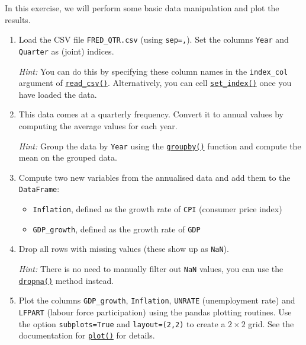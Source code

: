 \documentclass{scrartcl}
\providecommand{\tightlist}{%
      \setlength{\itemsep}{0pt}\setlength{\parskip}{0pt}}
\begin{document}
In this exercise, we will perform some basic data manipulation and plot
the results.

\begin{enumerate}
\def\labelenumi{\arabic{enumi}.}
\item
  Load the CSV file \texttt{FRED\_QTR.csv} (using
  \texttt{sep=\textquotesingle{},\textquotesingle{}}). Set the columns
  \texttt{Year} and \texttt{Quarter} as (joint) indices.

  \emph{Hint:} You can do this by specifying these column names in the
  \texttt{index\_col} argument of
  \href{https://pandas.pydata.org/pandas-docs/stable/reference/api/pandas.read_csv.html}{\texttt{read\_csv()}}.
  Alternatively, you can cell
  \href{https://pandas.pydata.org/pandas-docs/stable/reference/api/pandas.DataFrame.set_index.html}{\texttt{set\_index()}}
  once you have loaded the data.
\item
  This data comes at a quarterly frequency. Convert it to annual values
  by computing the average values for each year.

  \emph{Hint:} Group the data by \texttt{Year} using the
  \href{https://pandas.pydata.org/pandas-docs/stable/reference/api/pandas.DataFrame.groupby.html}{\texttt{groupby()}}
  function and compute the mean on the grouped data.
\item
  Compute two new variables from the annualised data and add them to the
  \texttt{DataFrame}:

  \begin{itemize}
  \tightlist
  \item
    \texttt{Inflation}, defined as the growth rate of \texttt{CPI}
    (consumer price index)
  \item
    \texttt{GDP\_growth}, defined as the growth rate of \texttt{GDP}
  \end{itemize}
\item
  Drop all rows with missing values (these show up as \texttt{NaN}).

  \emph{Hint:} There is no need to manually filter out \texttt{NaN}
  values, you can use the
  \href{https://pandas.pydata.org/pandas-docs/stable/reference/api/pandas.DataFrame.dropna.html}{\texttt{dropna()}}
  method instead.
\item
  Plot the columns \texttt{GDP\_growth}, \texttt{Inflation},
  \texttt{UNRATE} (unemployment rate) and \texttt{LFPART} (labour force
  participation) using the pandas plotting routines. Use the option
  \texttt{subplots=True} and \texttt{layout=(2,2)} to create a
  \(2\times2\) grid. See the documentation for
  \href{https://pandas.pydata.org/docs/reference/api/pandas.DataFrame.plot.html\#pandas.DataFrame.plot}{\texttt{plot()}}
  for details.
\end{enumerate}
\end{document}
